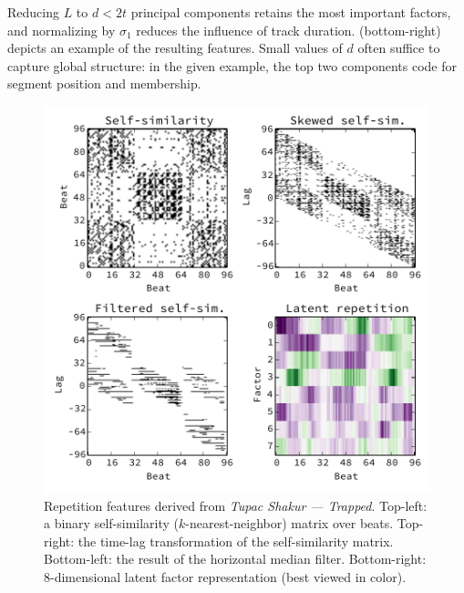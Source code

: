 \documentclass{article}
\begin{document}
Reducing $L$ to $d < 2t$ principal components retains the most important factors, and normalizing by $\sigma_1$ reduces 
the influence of track duration. 
 (bottom-right) depicts an example of the resulting features.  
Small values of $d$ often suffice to capture global structure: in the given
example, the top two components code for segment position and membership.

\begin{figure}
\centering%
\includegraphics[width=\columnwidth]{figs/rep}
\vspace{-2\baselineskip}
\caption{Repetition features derived from \emph{Tupac Shakur --- Trapped}. 
Top-left: a binary self-similarity ($k$-nearest-neighbor) matrix over beats.
Top-right: the time-lag transformation of the self-similarity matrix.
Bottom-left: the result of the horizontal median filter.
Bottom-right: 8-dimensional latent factor representation (best viewed in color).}
\label{fig:rep}
\end{figure}
\end{document}
